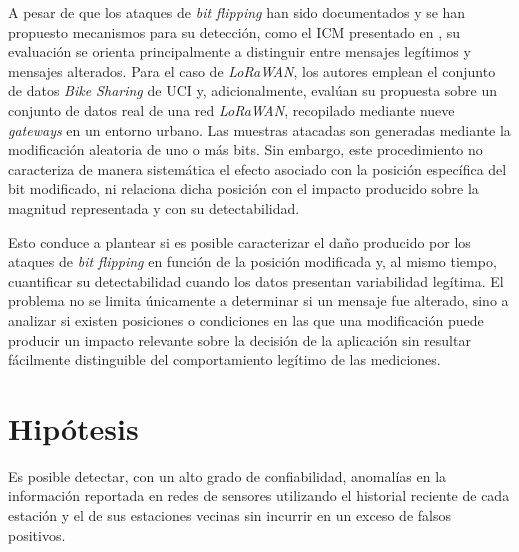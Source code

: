 A pesar de que los ataques de \textit{bit flipping} han sido documentados y se han propuesto mecanismos para su detección, como el ICM presentado en \cite{alizadeh2023bitflipping}, su evaluación se orienta principalmente a distinguir entre mensajes legítimos y mensajes alterados. Para el caso de \textit{LoRaWAN}, los autores emplean el conjunto de datos \textit{Bike Sharing} de UCI y, adicionalmente, evalúan su propuesta sobre un conjunto de datos real de una red \textit{LoRaWAN}, recopilado mediante nueve \textit{gateways} en un entorno urbano. Las muestras atacadas son generadas mediante la modificación aleatoria de uno o más bits. Sin embargo, este procedimiento no caracteriza de manera sistemática el efecto asociado con la posición específica del bit modificado, ni relaciona dicha posición con el impacto producido sobre la magnitud representada y con su detectabilidad.

Esto conduce a plantear si es posible caracterizar el daño producido por los ataques de \textit{bit flipping} en función de la posición modificada y, al mismo tiempo, cuantificar su detectabilidad cuando los datos presentan variabilidad legítima. El problema no se limita únicamente a determinar si un mensaje fue alterado, sino a analizar si existen posiciones o condiciones en las que una modificación puede producir un impacto relevante sobre la decisión de la aplicación sin resultar fácilmente distinguible del comportamiento legítimo de las mediciones.

\section{Hipótesis}

Es posible detectar, con un alto grado de confiabilidad, anomalías en la información reportada en redes de sensores utilizando el historial reciente de cada estación y el de sus estaciones vecinas sin incurrir en un exceso de falsos positivos.

